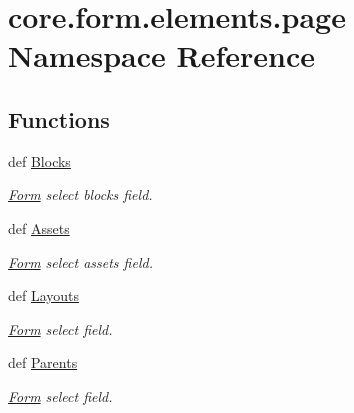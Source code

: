\hypertarget{namespacecore_1_1form_1_1elements_1_1page}{\section{core.\-form.\-elements.\-page Namespace Reference}
\label{namespacecore_1_1form_1_1elements_1_1page}
}
\subsection*{Functions}
\begin{DoxyCompactItemize}
\item 
def \hyperlink{namespacecore_1_1form_1_1elements_1_1page_a44b46fc44b430fde50b6c9673bb7a991}{Blocks}
\begin{DoxyCompactList}\small\item\em \hyperlink{classcore_1_1form_1_1Form}{Form} select blocks field. \end{DoxyCompactList}\item 
def \hyperlink{namespacecore_1_1form_1_1elements_1_1page_acc430d515b5b14c414e6adebc3242ae9}{Assets}
\begin{DoxyCompactList}\small\item\em \hyperlink{classcore_1_1form_1_1Form}{Form} select assets field. \end{DoxyCompactList}\item 
def \hyperlink{namespacecore_1_1form_1_1elements_1_1page_a82bc8740fbe0613a275e3f69c39a4566}{Layouts}
\begin{DoxyCompactList}\small\item\em \hyperlink{classcore_1_1form_1_1Form}{Form} select field. \end{DoxyCompactList}\item 
def \hyperlink{namespacecore_1_1form_1_1elements_1_1page_a6843c7345eaa05bb5d5d26f2dd901f24}{Parents}
\begin{DoxyCompactList}\small\item\em \hyperlink{classcore_1_1form_1_1Form}{Form} select field. \end{DoxyCompactList}\end{DoxyCompactItemize}



